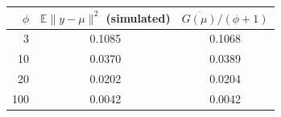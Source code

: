 \begin{tabular}{rcc}
\toprule
$\phi$ & $\mathbb E\|y-\mu\|^2$ (simulated) & $\overline{G(\mu)}/(\phi+1)$ \\
\midrule
3 & 0.1085 & 0.1068 \\
10 & 0.0370 & 0.0389 \\
20 & 0.0202 & 0.0204 \\
100 & 0.0042 & 0.0042 \\
\bottomrule
\end{tabular}